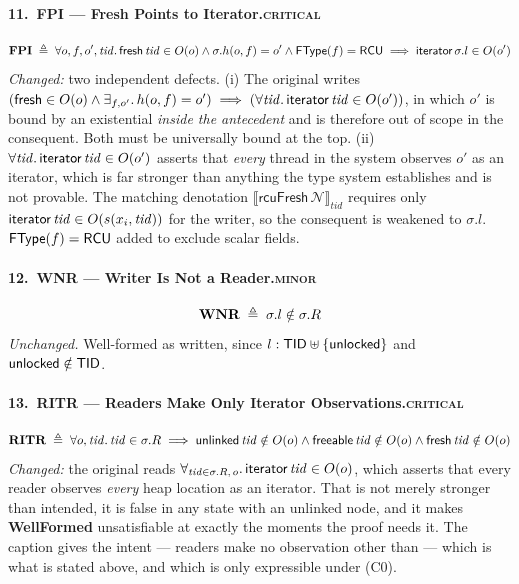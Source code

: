 \paragraph{11.\ FPI --- Fresh Points to Iterator.\hfill\textsc{critical}}
\[
\textbf{FPI} \;\triangleq\; \forall o,f,o',\mathit{tid} \ldotp
  \textsf{fresh}\,\mathit{tid} \in O(o) \land \sigma.h(o,f) = o' \land \textsf{FType}(f) = \textsf{RCU}
  \implies \textsf{iterator}\,\sigma.l \in O(o')
\]
\emph{Changed:} two independent defects.  (i) The original writes
$(\textsf{fresh} \in O(o) \land \exists_{f,o'} \ldotp h(o,f) = o') \implies (\forall
\mathit{tid} \ldotp \textsf{iterator}\,\mathit{tid} \in O(o'))$, in which $o'$ is bound by an
existential \emph{inside the antecedent} and is therefore out of scope in the
consequent.  Both must be universally bound at the top.  (ii) $\forall
\mathit{tid} \ldotp \textsf{iterator}\,\mathit{tid} \in O(o')$ asserts that \emph{every}
thread in the system observes $o'$ as an iterator, which is far stronger than
anything the type system establishes and is not provable.  The matching
denotation $\llbracket \textsf{rcuFresh}\,\mathcal{N} \rrbracket_{tid}$ requires
only $\textsf{iterator}\,\mathit{tid} \in O(s(x_i,\mathit{tid}))$ for the writer, so the
consequent is weakened to $\sigma.l$.  $\textsf{FType}(f) = \textsf{RCU}$ added to exclude
scalar fields.

\paragraph{12.\ WNR --- Writer Is Not a Reader.\hfill\textsc{minor}}
\[\textbf{WNR} \;\triangleq\; \sigma.l \notin \sigma.R\]
\emph{Unchanged.}  Well-formed as written, since $l : \textsf{TID} \uplus
\{\textsf{unlocked}\}$ and $\textsf{unlocked} \notin \textsf{TID}$.

\paragraph{13.\ RITR --- Readers Make Only Iterator Observations.\hfill\textsc{critical}}
\[
\textbf{RITR} \;\triangleq\; \forall o,\mathit{tid} \ldotp \mathit{tid} \in \sigma.R \implies
  \textsf{unlinked}\,\mathit{tid} \notin O(o) \land \textsf{freeable}\,\mathit{tid} \notin O(o) \land \textsf{fresh}\,\mathit{tid} \notin O(o)
\]
\emph{Changed:} the original reads
$\forall_{\mathit{tid} \in \sigma.R,\,o} \ldotp \textsf{iterator}\,\mathit{tid} \in O(o)$,
which asserts that every reader observes \emph{every} heap location as an
iterator.  That is not merely stronger than intended, it is false in any state
with an unlinked node, and it makes \textbf{WellFormed} unsatisfiable at exactly
the moments the proof needs it.  The caption gives the intent --- readers make
no observation other than \itr{} --- which is what is stated above, and which is
only expressible under (C0).

